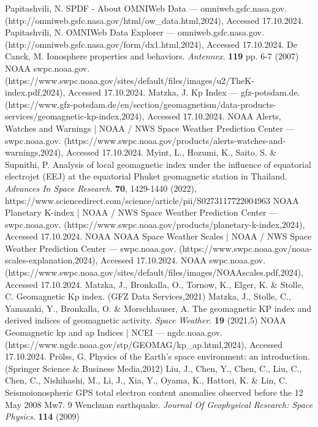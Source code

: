 \documentclass[sn-mathphys-num]{sn-jnl}%
\begin{document}
\begin{thebibliography}{000}
Papitashvili, N. SPDF - About OMNIWeb Data — omniweb.gsfc.nasa.gov. (http://omniweb.gsfc.nasa.gov/html/ow_data.html,2024), Accessed 17.10.2024.
Papitashvili, N. OMNIWeb Data Explorer — omniweb.gsfc.nasa.gov. (http://omniweb.gsfc.nasa.gov/form/dx1.html,2024), Accessed 17.10.2024.
De Canck, M. Ionosphere properties and behaviors. {\em Antennex}. \textbf{119} pp. 6-7 (2007)
NOAA swpc.noaa.gov. (https://www.swpc.noaa.gov/sites/default/files/images/u2/TheK-index.pdf,2024), Accessed 17.10.2024.
Matzka, J. Kp Index — gfz-potsdam.de. (https://www.gfz-potsdam.de/en/section/geomagnetism/data-products-services/geomagnetic-kp-index,2024), Accessed 17.10.2024.
NOAA Alerts, Watches and Warnings | NOAA / NWS Space Weather Prediction Center — swpc.noaa.gov. (https://www.swpc.noaa.gov/products/alerts-watches-and-warnings,2024), Accessed 17.10.2024.
Myint, L., Hozumi, K., Saito, S. \& Supnithi, P. Analysis of local geomagnetic index under the influence of equatorial electrojet (EEJ) at the equatorial Phuket geomagnetic station in Thailand. {\em Advances In Space Research}. \textbf{70}, 1429-1440 (2022), https://www.sciencedirect.com/science/article/pii/S0273117722004963
NOAA Planetary K-index | NOAA / NWS Space Weather Prediction Center — swpc.noaa.gov. (https://www.swpc.noaa.gov/products/planetary-k-index,2024), Accessed 17.10.2024.
NOAA NOAA Space Weather Scales | NOAA / NWS Space Weather Prediction Center — swpc.noaa.gov. (https://www.swpc.noaa.gov/noaa-scales-explanation,2024), Accessed 17.10.2024.
NOAA swpc.noaa.gov. (https://www.swpc.noaa.gov/sites/default/files/images/NOAAscales.pdf,2024), Accessed 17.10.2024.
Matzka, J., Bronkalla, O., Tornow, K., Elger, K. \& Stolle, C. Geomagnetic Kp index. (GFZ Data Services,2021)
Matzka, J., Stolle, C., Yamazaki, Y., Bronkalla, O. \& Morschhauser, A. The geomagnetic KP index and derived indices of geomagnetic activity. {\em Space Weather}. \textbf{19} (2021,5)
NOAA Geomagnetic kp and ap Indices | NCEI — ngdc.noaa.gov. (https://www.ngdc.noaa.gov/stp/GEOMAG/kp_ap.html,2024), Accessed 17.10.2024.
Prölss, G. Physics of the Earth’s space environment: an introduction. (Springer Science & Business Media,2012)
Liu, J., Chen, Y., Chen, C., Liu, C., Chen, C., Nishihashi, M., Li, J., Xia, Y., Oyama, K., Hattori, K. \& Lin, C. Seismoionospheric GPS total electron content anomalies observed before the 12 May 2008 Mw7. 9 Wenchuan earthquake. {\em Journal Of Geophysical Research: Space Physics}. \textbf{114} (2009)

\end{thebibliography}
\end{document}
